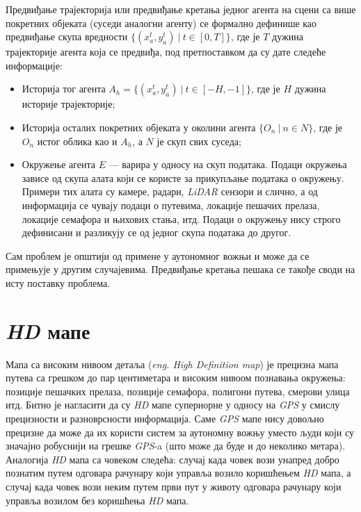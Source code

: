 \documentclass[11pt,oneside]{memoir}
\begin{document}
Предвиђање трајекторија или предвиђање кретања једног агента на сцени са више покретних објеката (суседи аналогни агенту) се формално
дефинише као предвиђање скупа вредности $\{(x^{t}_a, y^{t}_a)\ |\ t \in [0, T]\}$, где је $T$ дужина трајекторије агента која се предвиђа, 
под претпоставком да су дате следеће информације:
\begin{itemize}
  \item Историја тог агента $A_{h} = \{(x^{t}_a, y^{t}_a)\ |\ t \in [-H, -1]\}$, где је $H$ дужина историје трајекторије;
  \item Историја осталих покретних објеката у околини агента $\{O_{n}\ |\ n \in N\}$, 
        где је $O_{n}$ истог облика као и $A_{h}$, а $N$ је скуп свих суседа;
  \item Окружење агента $E$ --- варира у односу на скуп података. Подаци окружења зависе од скупа алата који се користе
        за прикупљање података о окружењу. Примери тих алата су камере, радари, \textit{LiDAR} сензори и слично, а 
        од информација се чувају подаци о путевима,
        локације пешачих прелаза, локације семафора и њихових стања, итд. Подаци о окружењу нису строго дефинисани и 
        разликују се од једног скупа података до другог.
\end{itemize}

Сам проблем је општији од примене у аутономног вожњи и може да се примењује у другим случајевима. Предвиђање кретања пешака се
такође своди на исту поставку проблема.

\section{\textit{HD} мапе}

Мапа са високим нивоом детаља (\textit{eng. High Definition map}) је прецизна
мапа путева са грешком до пар центиметара и високим нивоом
познавања окружења: позиције пешачких прелаза, позиције семафора, полигони путева, смерови улица итд. Битно је нагласити
да су \textit{HD} мапе супериорне у односу на \textit{GPS} у смислу прецизности и разноврсности информација. Саме \textit{GPS}
мапе нису довољно прецизне да може да их користи систем за аутономну вожњу уместо људи који су значајно робуснији на грешке
\textit{GPS}-a (што може да буде и до неколико метара). Аналогија 
\textit{HD} мапа са човеком следећа: случај када човек вози унапред добро познатим путем одговара рачунару који управља
возило коришћењем \textit{HD} мапа, а случај када човек вози неким путем први пут у животу одговара рачунару који управља возилом
без коришћења \textit{HD} мапа.
\end{document}
